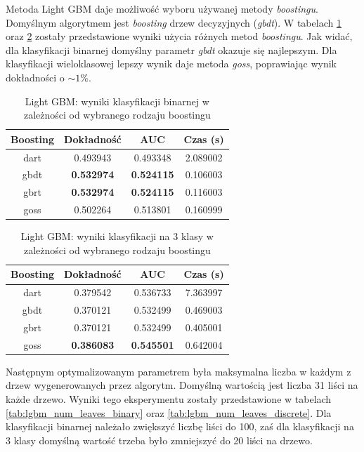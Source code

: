 \documentclass[a4paper, twoside, 11pt, openright]{article}
\begin{document}
Metoda Light GBM daje możliwość wyboru używanej metody \textit{boostingu}. Domyślnym algorytmem jest \textit{boosting} drzew decyzyjnych (\textit{gbdt}). W tabelach \ref{tab:lgbm_boosting_binary} oraz \ref{tab:lgbm_boosting_discrete} zostały przedstawione wyniki użycia różnych metod \textit{boostingu}. Jak widać, dla klasyfikacji binarnej domyślny parametr \textit{gbdt} okazuje się najlepszym. Dla klasyfikacji wieloklasowej lepszy wynik daje metoda \textit{goss}, poprawiając wynik dokładności o $\sim 1\%$.

\begin{table}[H]
    \centering
    \begin{tabular}{|c|c|c|c|}
    \hline
        \textbf{Boosting} & \textbf{Dokładność} & \textbf{AUC} & \textbf{Czas (s)} \\ \hline
dart     &  0.493943 &  0.493348 &    2.089002 \\ \hline
gbdt     &  \textbf{0.532974} &  \textbf{0.524115} &    0.106003 \\ \hline
gbrt     &  \textbf{0.532974} &  \textbf{0.524115} &    0.116003 \\ \hline
goss     &  0.502264 &  0.513801 &    0.160999 \\ \hline
    \end{tabular}
    \caption{Light GBM: wyniki klasyfikacji binarnej w zależności od wybranego rodzaju boostingu}
    \label{tab:lgbm_boosting_binary}
\end{table}

\begin{table}[H]
    \centering
    \begin{tabular}{|c|c|c|c|}
    \hline
        \textbf{Boosting} & \textbf{Dokładność} & \textbf{AUC} & \textbf{Czas (s)} \\ \hline
dart     &  0.379542 &  0.536733 &    7.363997 \\ \hline
gbdt     &  0.370121 &  0.532499 &    0.469003 \\ \hline
gbrt     &  0.370121 &  0.532499 &    0.405001 \\ \hline
goss     &  \textbf{0.386083} &  \textbf{0.545501} &    0.642004 \\ \hline
    \end{tabular}
    \caption{Light GBM: wyniki klasyfikacji na 3 klasy w zależności od wybranego rodzaju boostingu}
    \label{tab:lgbm_boosting_discrete}
\end{table}

Następnym optymalizowanym parametrem była maksymalna liczba w każdym z drzew wygenerowanych przez algorytm. Domyślną wartością jest liczba 31 liści na każde drzewo. Wyniki tego eksperymentu zostały przedstawione w tabelach \ref{tab:lgbm_num_leaves_binary} oraz \ref{tab:lgbm_num_leaves_discrete}. Dla klasyfikacji binarnej należało zwiększyć liczbę liści do 100, zaś dla klasyfikacji na 3 klasy domyślną wartość trzeba było zmniejszyć do 20 liści na drzewo. 
\end{document}
